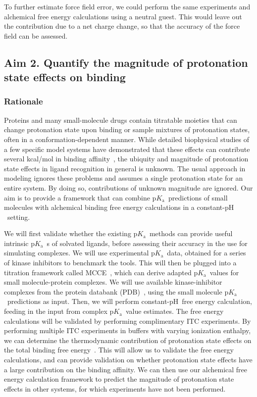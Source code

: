 \documentclass[10pt,final]{article}
\newcommand{\pKa}{p$K_\mathrm{a}$\ }
\newcommand{\pH}{p$\mathrm{H}$\ }
\begin{document}
To further estimate force field error, we could perform the same experiments and alchemical free energy calculations using a neutral guest. 
%
This would leave out the contribution due to a net charge change, so that the accuracy of the force field can be assessed.


\subsection*{Aim 2. Quantify the magnitude of protonation state effects on binding}
\subsubsection*{Rationale}

Proteins and many small-molecule drugs contain titratable moieties that can change protonation state upon binding or sample mixtures of protonation states, often in a conformation-dependent manner.
%
While detailed biophysical studies of a few specific model systems have demonstrated that these effects can contribute several kcal/mol in binding affinity~\cite{Aleksandrov2007a,Czodrowski2007a,Steuber2007a,Czodrowski2007b},
the ubiquity and magnitude of protonation state effects in ligand recognition in general is unknown.
%
The usual approach in modeling ignores these problems and assumes a single protonation state for an entire system.
%
By doing so, contributions of unknown magnitude are ignored.
%
Our aim is to provide a framework that can combine \pKa predictions of small molecules with alchemical binding free energy calculations in a constant-\pH setting.

We will first validate whether the existing \pKa methods can provide useful intrinsic \pKa s of solvated ligands, before assessing their accuracy in the use for simulating complexes.
%
We will use experimental \pKa data, obtained for a series of kinase inhibitors to benchmark the tools.
%
This will then be plugged into a titration framework called MCCE~\cite{Song2009a}, which can derive adapted \pKa values for small molecule-protein  complexes.
%
We will use available kinase-inhibitor complexes from the protein databank (PDB)~\cite{Berman2000a}, using the small molecule \pKa predictions as input.
%
Then, we will perform constant-\pH free energy calculation, feeding in the input from complex \pKa value estimates.
%
The free energy calculations will be validated by performing complimentary ITC experiments.
%
By performing multiple ITC experiments in buffers with varying ionization enthalpy, we can determine the thermodynamic contribution of protonation state effects on the total binding free energy~\cite{Baker1996a,Neeb2014a}.
%
This will allow us to validate the free energy calculations, and can provide validation on whether protonation state effects have a large contribution on the binding affinity.
%
We can then use our alchemical free energy calculation framework to predict the magnitude of protonation state effects in other systems, for which experiments have not been performed.
\end{document}
